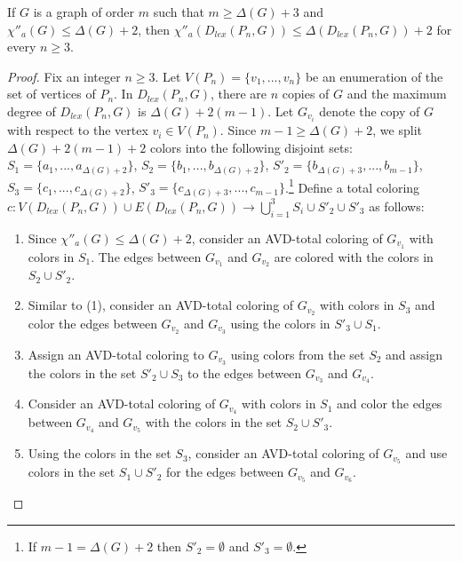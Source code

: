 \documentclass[10pt,a4paper]{amsart}
\begin{document}
\begin{thm}\label{Theorem 3.6}
If $G$ is a graph of order $m$ such that $m\geq \Delta(G)+3$ and $\chi''_{a}(G)\leq \Delta(G)+2$, then $\chi''_{a}(D_{lex}(P_n, G))\leq \Delta(D_{lex}(P_n, G))+2$ for every  $n\geq 3$. 
\end{thm}

\begin{proof}
Fix an integer $n\geq 3$. Let $V(P_n)=\{v_1,...,v_n\}$ be an enumeration of the set of vertices of $P_n$. In $D_{lex}(P_n, G)$, there are $n$ copies of $G$ and the maximum degree of $D_{lex}(P_n, G)$ is $\Delta(G)+2(m-1)$. 
Let $G_{v_i}$ denote the copy of $G$ with respect to the vertex $v_i\in V(P_n)$.
Since $m-1\geq\Delta(G)+2$, we split $\Delta(G)+2(m-1)+2$ colors into the following disjoint sets:
$S_1=\{a_1,...,a_{\Delta(G)+2}\}$, $S_2=\{b_1,...,b_{\Delta(G)+2}\}$, $S'_{2}=\{b_{\Delta(G)+3},...,b_{m-1}\}$, $S_3=\{c_1,...,c_{\Delta(G)+2}\}$, $S'_{3}=\{c_{\Delta(G)+3},...,c_{m-1}\}$.\footnote{If $m-1=\Delta(G)+2$ then $S'_2=\emptyset$ and $S'_3=\emptyset$.} Define a total coloring
$c:V(D_{lex}(P_n,G))\cup E(D_{lex}(P_n,G))
\longrightarrow \bigcup_{i=1}^{3}S_i\cup S'_2\cup S'_3$ as follows: 

\begin{enumerate}
    \item Since $\chi''_{a}(G)\leq \Delta(G)+2$, consider an AVD-total coloring of $G_{v_1}$ with colors in $S_1$. 
    The edges between $G_{v_{1}}$ and $G_{v_{2}}$ are colored with the colors in $S_2\cup S'_2$.
    \item Similar to (1), consider 
    an AVD-total coloring of $G_{v_2}$ with colors in $S_3$ and color the edges between
    $G_{v_{2}}$ and $G_{v_{3}}$ using the colors in $S'_3\cup S_1$. 
    
    \item Assign an AVD-total coloring to $G_{v_3}$ using colors from the set $S_2$
    and assign the colors in the set $S'_2\cup S_3$ to the edges between $G_{v_3}$ and $G_{v_4}$.
    
    \item Consider 
    an AVD-total coloring of $G_{v_4}$ with colors in $S_1$ and color the edges between $G_{v_4}$ and $G_{v_5}$ with the colors in the set $S_2\cup S'_3$.

    \item Using the colors in the set $S_3$, consider 
    an AVD-total coloring of $G_{v_5}$
    and use colors in the set $S_1\cup S'_2$ for the edges between $G_{v_5}$ and $G_{v_6}$.


\end{enumerate}
\end{proof}
\end{document}
